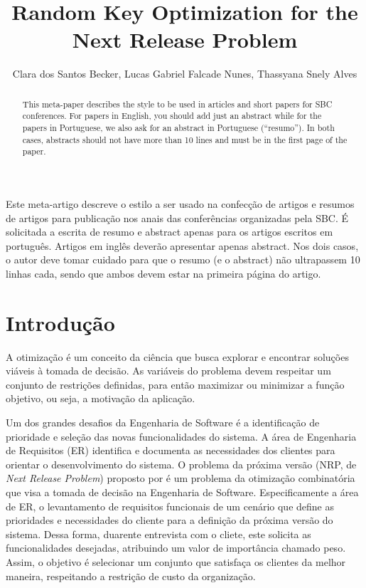 \documentclass[12pt]{article}
\title{Random Key Optimization for the Next Release Problem}
\author{Clara dos Santos Becker\inst{1}, Lucas Gabriel Falcade Nunes\inst{1}, Thassyana Snely Alves\inst{1} }
\begin{document}
 

\maketitle

\begin{abstract}
  This meta-paper describes the style to be used in articles and short papers
  for SBC conferences. For papers in English, you should add just an abstract
  while for the papers in Portuguese, we also ask for an abstract in
  Portuguese (``resumo''). In both cases, abstracts should not have more than
  10 lines and must be in the first page of the paper.
\end{abstract}
     
\begin{resumo} 
  Este meta-artigo descreve o estilo a ser usado na confecção de artigos e
  resumos de artigos para publicação nos anais das conferências organizadas
  pela SBC. É solicitada a escrita de resumo e abstract apenas para os artigos
  escritos em português. Artigos em inglês deverão apresentar apenas abstract.
  Nos dois casos, o autor deve tomar cuidado para que o resumo (e o abstract)
  não ultrapassem 10 linhas cada, sendo que ambos devem estar na primeira
  página do artigo.
\end{resumo}


\section{Introdução}

    A otimização é um conceito da ciência que busca explorar e encontrar soluções viáveis à tomada de decisão. As variáveis do problema devem respeitar um conjunto de restrições definidas, para então maximizar ou minimizar a função objetivo, ou seja, a motivação da aplicação.

    Um dos grandes desafios da Engenharia de Software é a identificação de prioridade e seleção das novas funcionalidades do sistema. A área de Engenharia de Requisitos (ER) identifica e documenta as necessidades dos clientes para orientar o desenvolvimento do sistema. O problema da próxima versão (NRP, de\textit{ Next Release Problem}) proposto por \cite{bagnall2001next} é um problema da otimização combinatória que visa a tomada de decisão na Engenharia de Software. Especificamente a área de ER, o levantamento de requisitos funcionais de um cenário que define as prioridades e necessidades do cliente para a definição da próxima versão do sistema. Dessa forma, duarente entrevista com o cliete, este solicita as funcionalidades desejadas, atribuindo um valor de importância chamado peso. Assim, o objetivo é selecionar um conjunto que satisfaça os clientes da melhor maneira, respeitando a restrição de custo da organização.
\end{document}
